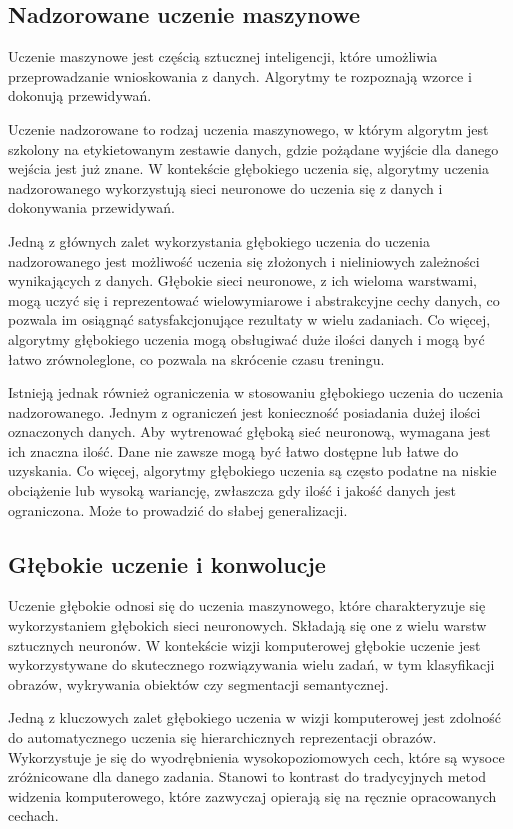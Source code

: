 \subsection{Nadzorowane uczenie maszynowe}

Uczenie maszynowe jest częścią sztucznej inteligencji, które umożliwia przeprowadzanie wnioskowania z danych. Algorytmy te rozpoznają wzorce i dokonują przewidywań.

Uczenie nadzorowane to rodzaj uczenia maszynowego, w którym algorytm jest szkolony na etykietowanym zestawie danych, gdzie pożądane wyjście dla danego wejścia jest już znane. W kontekście głębokiego uczenia się, algorytmy uczenia nadzorowanego wykorzystują sieci neuronowe do uczenia się z danych i dokonywania przewidywań.

Jedną z głównych zalet wykorzystania głębokiego uczenia do uczenia nadzorowanego jest możliwość uczenia się złożonych i nieliniowych zależności wynikających z danych. Głębokie sieci neuronowe, z ich wieloma warstwami, mogą uczyć się i reprezentować wielowymiarowe i abstrakcyjne cechy danych, co pozwala im osiągnąć satysfakcjonujące rezultaty w wielu zadaniach. Co więcej, algorytmy głębokiego uczenia mogą obsługiwać duże ilości danych i mogą być łatwo zrównoleglone, co pozwala na skrócenie czasu treningu.

Istnieją jednak również ograniczenia w stosowaniu głębokiego uczenia do uczenia nadzorowanego. Jednym z ograniczeń jest konieczność posiadania dużej ilości oznaczonych danych. Aby wytrenować głęboką sieć neuronową, wymagana jest ich znaczna ilość. Dane nie zawsze mogą być łatwo dostępne lub łatwe do uzyskania. Co więcej, algorytmy głębokiego uczenia są często podatne na niskie obciążenie lub wysoką wariancję, zwłaszcza gdy ilość i jakość danych jest ograniczona. Może to prowadzić do słabej generalizacji.
\subsection{Głębokie uczenie i konwolucje}
Uczenie głębokie odnosi się do uczenia maszynowego, które charakteryzuje się wykorzystaniem głębokich sieci neuronowych. Składają się one z wielu warstw sztucznych neuronów. W kontekście wizji komputerowej głębokie uczenie jest wykorzystywane do skutecznego rozwiązywania wielu zadań, w tym klasyfikacji obrazów, wykrywania obiektów czy segmentacji semantycznej.

Jedną z kluczowych zalet głębokiego uczenia w wizji komputerowej jest zdolność do automatycznego uczenia się hierarchicznych reprezentacji obrazów. Wykorzystuje je się do wyodrębnienia wysokopoziomowych cech, które są wysoce zróżnicowane dla danego zadania. Stanowi to kontrast do tradycyjnych metod widzenia komputerowego, które zazwyczaj opierają się na ręcznie opracowanych cechach.


